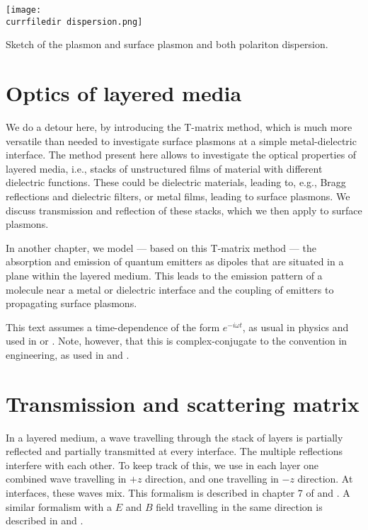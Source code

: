 \begin{marginfigure}
\texttt{[image: \\currfiledir dispersion.png]}
\caption{Sketch of the plasmon and surface plasmon and both polariton dispersion. \label{fig:surface_dispersions}}
\end{marginfigure}





\section{Optics of layered media}

We do a detour here, by introducing the T-matrix method, which is much more versatile than needed to investigate surface plasmons at a simple metal-dielectric interface. The method present here allows to  investigate the optical properties of layered media, i.e., stacks of unstructured   films of material with different dielectric functions. These could be dielectric materials, leading to, e.g., Bragg reflections and dielectric filters, or metal films, leading to surface plasmons. We discuss transmission and reflection of these stacks, which we then apply to surface plasmons.


In another chapter, we model --- based on this T-matrix method --- the absorption and emission of quantum emitters  as dipoles that are situated in a plane within the layered medium. This leads to the emission pattern of a molecule near a metal or dielectric interface and the coupling of emitters to propagating surface plasmons.

This text assumes a time-dependence of the form $e^{-i \omega t}$, as usual in physics and used in \cite{Novotny-Hecht2012} or \cite{BornWolf2002}. Note, however, that this is complex-conjugate to the convention in engineering, as used in \cite{SalehTeich1991} and \cite{Yeh2005}.


\section{Transmission and scattering matrix}


In a layered medium, a wave travelling through the stack of layers is  partially reflected and partially transmitted at every interface. The multiple reflections interfere with each other. To keep track of this, we use in each layer one combined wave travelling in $+z$ direction, and one travelling in $-z$ direction. At interfaces, these waves mix. This formalism is described in  chapter 7 of \cite{SalehTeich1991} and \cite{Yeh2005}. A similar formalism with a $E$ and $B$ field travelling in the same direction is described in \cite{Pedrotti2008} and \cite{Macleod2001}.

